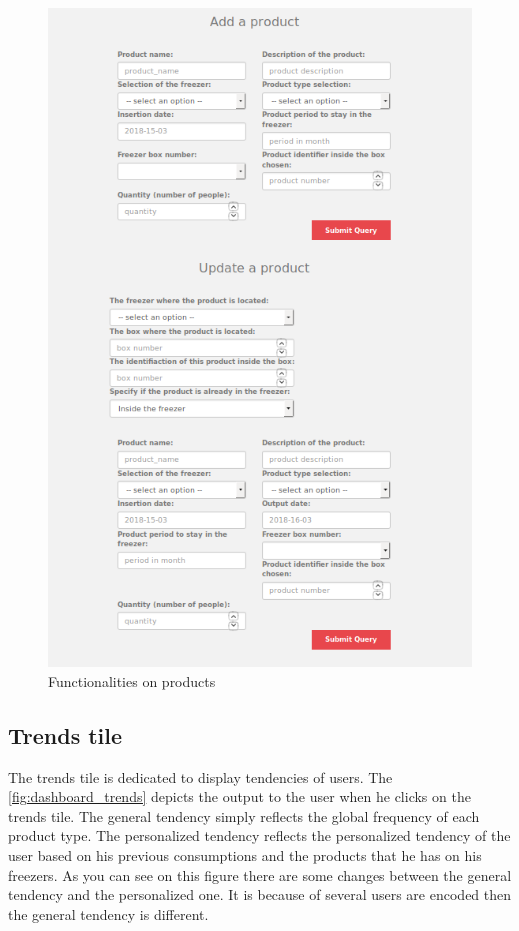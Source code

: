 \begin{figure}[H]
\centering
\includegraphics[scale=0.5]{./images/dashboard_products2.png}
\caption{Functionalities on products}
\label{fig:dashboard_products2}
\end{figure}

\subsection{Trends tile}
The trends tile is dedicated to display tendencies of users. The \autoref{fig:dashboard_trends} depicts the output to the user when he clicks on the trends tile. The general tendency simply reflects the global frequency of each product type. The personalized tendency reflects the personalized tendency of the user based on his previous consumptions and the products that he has on his freezers. As you can see on this figure there are some changes between the general tendency and the personalized one. It is because of several users are encoded then the general tendency is different.

